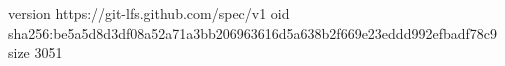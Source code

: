 version https://git-lfs.github.com/spec/v1
oid sha256:be5a5d8d3df08a52a71a3bb206963616d5a638b2f669e23eddd992efbadf78c9
size 3051
